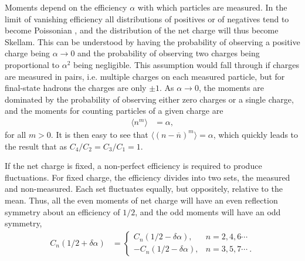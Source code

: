 Moments depend on the efficiency $\alpha$ with which particles are measured. In the limit of vanishing efficiency all distributions of positives or of negatives tend to become Poissonian \cite{Bzdak:2012ab}, and the distribution of the net charge will thus become Skellam.  This can be understood by having the probability of observing a positive charge being $\alpha\rightarrow 0$ and the probability of observing two charges being proportional to $\alpha^2$ being negligible. This assumption would fall through if charges are measured in pairs, i.e. multiple charges on each measured particle, but for final-state hadrons the charges are only $\pm 1$. As $\alpha\rightarrow 0$, the moments are dominated by the probability of observing either zero charges or a single charge, and the moments for counting particles of a given charge are
\begin{eqnarray}
\langle n^m\rangle&=\alpha,
\end{eqnarray}
for all $m>0$. It is then easy to see that $\langle (n-\overline{n})^m\rangle=\alpha$, which quickly leads to the result that as $C_4/C_2=C_3/C_1=1$.

If the net charge is fixed, a non-perfect efficiency is required to produce fluctuations. For fixed charge, the efficiency divides into two sets, the measured and non-measured. Each set fluctuates equally, but oppositely, relative to the mean. Thus, all the even moments of net charge will have an even reflection symmetry about an efficiency of $1/2$, and the odd moments will have an odd symmetry,
\begin{eqnarray}
\label{eq:alphasymm}
C_n(1/2+\delta\alpha)&=\left\{\begin{array}{rl}
C_n(1/2-\delta\alpha),&n=2,4,6\cdots\\
-C_n(1/2-\delta\alpha),&n=3,5,7\cdots~.\end{array}\right.
\end{eqnarray}

